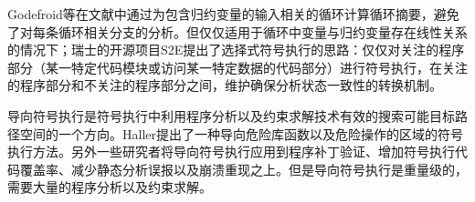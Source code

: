 Godefroid等在文献中通过为包含归约变量的输入相关的循环计算循环摘要，避免了对每条循环相关分支的分析。但仅仅适用于循环中变量与归约变量存在线性关系的情况下；瑞士的开源项目S2E提出了选择式符号执行的思路：仅仅对关注的程序部分（某一特定代码模块或访问某一特定数据的代码部分）进行符号执行，在关注的程序部分和不关注的程序部分之间，维护确保分析状态一致性的转换机制。


导向符号执行是符号执行中利用程序分析以及约束求解技术有效的搜索可能目标路径空间的一个方向。Haller提出了一种导向危险库函数以及危险操作的区域的符号执行方法。另外一些研究者将导向符号执行应用到程序补丁验证、增加符号执行代码覆盖率、减少静态分析误报以及崩溃重现之上。但是导向符号执行是重量级的，需要大量的程序分析以及约束求解。

%
%
%
%
%

